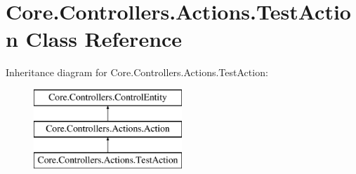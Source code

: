 \hypertarget{classCore_1_1Controllers_1_1Actions_1_1TestAction}{\section{Core.\-Controllers.\-Actions.\-Test\-Action Class Reference}
\label{classCore_1_1Controllers_1_1Actions_1_1TestAction}
}
Inheritance diagram for Core.\-Controllers.\-Actions.\-Test\-Action\-:\begin{figure}[H]
\begin{center}
\leavevmode
\includegraphics[height=3.000000cm]{classCore_1_1Controllers_1_1Actions_1_1TestAction}
\end{center}
\end{figure}
